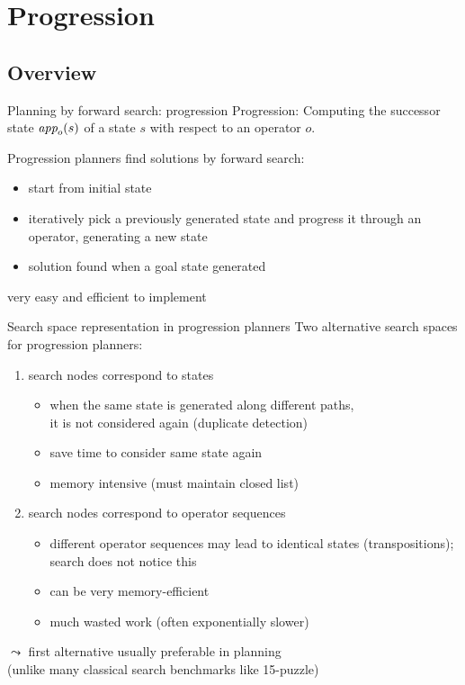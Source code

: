 \documentclass{gkibeamer}
\begin{document}
\section{Progression}
\subsection{Overview}

\begin{frame}{Planning by forward search: progression}
  \alert{Progression:} Computing the successor state $\textit{app}_{o}(s)$
  of a state $s$ with respect to an operator $o$.

  \medskip

  \alert{Progression planners} find solutions by forward search:
  \begin{itemize}
  \item start from initial state
  \item iteratively pick a previously generated state and
    \alert{progress it} through an operator, generating a new state
  \item solution found when a goal state generated
  \end{itemize}

  \medskip

   very easy and efficient to implement
\end{frame}

\begin{frame}{Search space representation in progression planners}
  Two alternative search spaces for progression planners:
  \begin{enumerate}
  \item \alert{search nodes correspond to states}
    \begin{itemize}
    \item when the same state is generated along different paths, \\
      it is not considered again (\alert{duplicate detection})
    \item {} save time to consider same state again
    \item {} memory intensive (must maintain \alert{closed
      list})
    \end{itemize}
  \item \alert{search nodes correspond to operator sequences}
    \begin{itemize}
    \item different operator sequences may lead to identical states
      (\alert{transpositions}); search does not notice this
    \item {} can be very memory-efficient
    \item {} much wasted work (often exponentially slower)
    \end{itemize}
  \end{enumerate}
  $\leadsto$ first alternative usually preferable in planning \\
  (\alert{unlike} many classical search benchmarks like 15-puzzle)
\end{frame}
\end{document}
